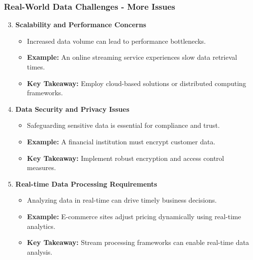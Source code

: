 \documentclass{beamer}
\begin{document}
\begin{frame}[fragile]
    \frametitle{Real-World Data Challenges - More Issues}
    \begin{enumerate}
        \setcounter{enumi}{2} %
        \item \textbf{Scalability and Performance Concerns}
        \begin{itemize}
            \item Increased data volume can lead to performance bottlenecks.
            \item \textbf{Example:} An online streaming service experiences slow data retrieval times.
            \item \textbf{Key Takeaway:} Employ cloud-based solutions or distributed computing frameworks.
        \end{itemize}
        
        \item \textbf{Data Security and Privacy Issues}
        \begin{itemize}
            \item Safeguarding sensitive data is essential for compliance and trust.
            \item \textbf{Example:} A financial institution must encrypt customer data.
            \item \textbf{Key Takeaway:} Implement robust encryption and access control measures.
        \end{itemize}
        
        \item \textbf{Real-time Data Processing Requirements}
        \begin{itemize}
            \item Analyzing data in real-time can drive timely business decisions.
            \item \textbf{Example:} E-commerce sites adjust pricing dynamically using real-time analytics.
            \item \textbf{Key Takeaway:} Stream processing frameworks can enable real-time data analysis.
        \end{itemize}
    \end{enumerate}
\end{frame}
\end{document}
